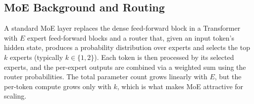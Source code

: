 \documentclass[10pt]{article}
\begin{document}
\subsection{MoE Background and Routing}
\label{sec:moe-background}

A standard MoE layer replaces the dense feed-forward block in a Transformer with $E$ expert feed-forward blocks and a router that, given an input token's hidden state, produces a probability distribution over experts and selects the top $k$ experts (typically $k \in \{1, 2\}$). Each token is then processed by its selected experts, and the per-expert outputs are combined via a weighted sum using the router probabilities. The total parameter count grows linearly with $E$, but the per-token compute grows only with $k$, which is what makes MoE attractive for scaling.
\end{document}
